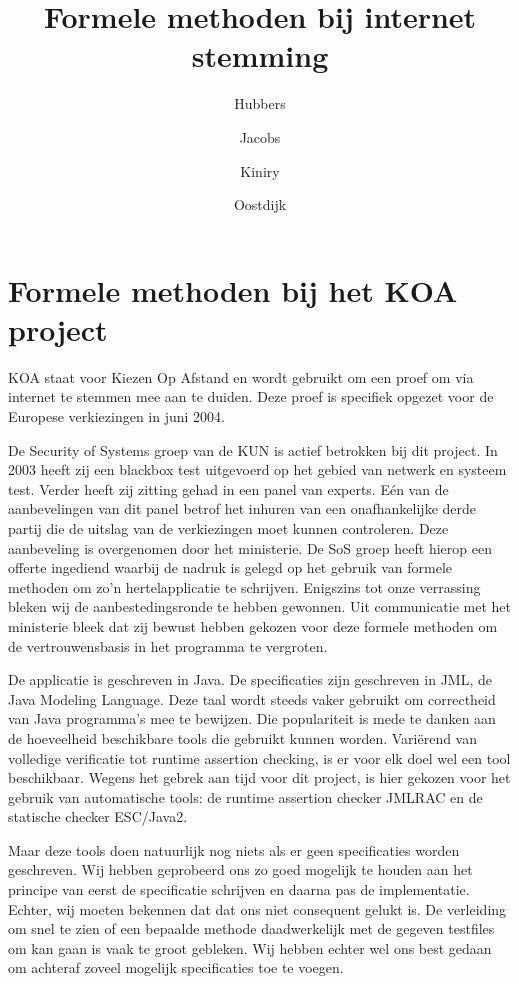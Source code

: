 \documentclass{article}
\author{Hubbers \and Jacobs \and Kiniry \and Oostdijk}
\title{Formele methoden bij internet stemming}
\begin{document}
\maketitle

\section{Formele methoden bij het KOA project}
KOA staat voor Kiezen Op Afstand en wordt gebruikt om een proef om via
internet te stemmen mee aan te duiden.
Deze proef is specifiek opgezet voor de Europese verkiezingen in juni 2004.

De Security of Systems groep van de KUN is actief betrokken bij dit project.
In 2003 heeft zij 
een blackbox test uitgevoerd op het gebied van netwerk en systeem test.
Verder heeft zij
zitting gehad in een panel van experts. E\'en van de aanbevelingen van dit panel betrof het inhuren van een onafhankelijke derde partij die de uitslag van
de verkiezingen moet kunnen controleren.
Deze aanbeveling is overgenomen door het ministerie. De SoS groep heeft hierop
een offerte ingediend waarbij de nadruk is gelegd op het gebruik van formele methoden om zo'n hertelapplicatie te schrijven.
Enigszins tot onze verrassing bleken wij de aanbestedingsronde te hebben 
gewonnen. Uit communicatie met het ministerie bleek dat zij bewust hebben 
gekozen voor deze formele methoden om de vertrouwensbasis in het programma
te vergroten.

De applicatie is geschreven in Java. De specificaties zijn geschreven in JML, 
de Java Modeling Language.
Deze taal wordt steeds vaker gebruikt om correctheid van Java programma's
mee te bewijzen. Die populariteit is mede te danken aan de hoeveelheid
beschikbare tools die gebruikt kunnen worden. Vari\"erend van volledige
verificatie tot runtime assertion checking, is er voor elk doel wel
een tool beschikbaar.
Wegens het gebrek aan tijd voor dit project, is hier gekozen voor het gebruik van automatische tools: de runtime assertion checker JMLRAC en de statische checker ESC/Java2. 

Maar deze tools doen natuurlijk nog niets als er geen specificaties worden
geschreven. Wij hebben geprobeerd ons zo goed mogelijk te houden aan het
principe van eerst de specificatie schrijven en daarna pas de implementatie.
Echter, wij moeten bekennen dat dat ons niet consequent gelukt is. De verleiding
om snel te zien of een bepaalde methode daadwerkelijk met de gegeven testfiles
om kan gaan is vaak te groot gebleken.
Wij hebben echter wel ons best gedaan om achteraf zoveel mogelijk specificaties
toe te voegen.
\end{document}

